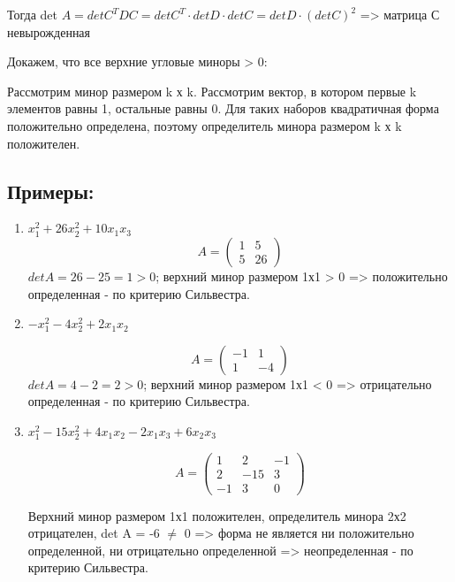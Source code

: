 \documentclass[12pt]{article}
\begin{document}
    Тогда det $A = det C^{T}DC = det C^{T} \cdot det D \cdot det C = det D \cdot (detC)^{2}$ => матрица С невырожденная

    Докажем, что все верхние угловые миноры > 0:

    Рассмотрим минор размером k х k. Рассмотрим вектор, в котором первые k элементов равны 1, остальные равны 0. Для таких наборов квадратичная форма положительно определена, поэтому определитель минора размером k х k положителен.

    \subsection{Примеры:}

    \begin{enumerate}
        \item $x^2_{1} + 26x^2_{2} + 10x_{1}x_{3}$
              \[
                  A = \left(
                  \begin{array}{rrr}
                          1 & 5  \\
                          5 & 26
                      \end{array}
                  \right)
              \]
              $det A = 26 - 25 = 1 > 0$; верхний минор размером 1х1 > 0 => положительно определенная - по критерию Сильвестра.

        \item $-x^2_{1} - 4x^2_{2} + 2x_{1}x_{2}$

              \[
                  A = \left(
                  \begin{array}{rrr}
                          -1 & 1  \\
                          1  & -4
                      \end{array}
                  \right)
              \]
              $det A = 4 - 2 = 2 > 0$; верхний минор размером 1х1 < 0 => отрицательно определенная - по критерию Сильвестра.
        \item $x^2_{1} - 15x^2_{2} + 4x_{1}x_{2} - 2x_{1} x_{3} + 6x_{2} x_{3}$

              \[A = \left(
                  \begin{array}{rrr}
                          1  & 2   & -1 \\
                          2  & -15 & 3  \\
                          -1 & 3   & 0
                      \end{array}
                  \right)\]

              Верхний минор размером 1х1 положителен, определитель минора 2х2 отрицателен, det A = -6 $\neq$ 0 => форма не является ни положительно определенной, ни отрицательно определенной => неопределенная - по критерию Сильвестра.
    \end{enumerate}
\end{document}
